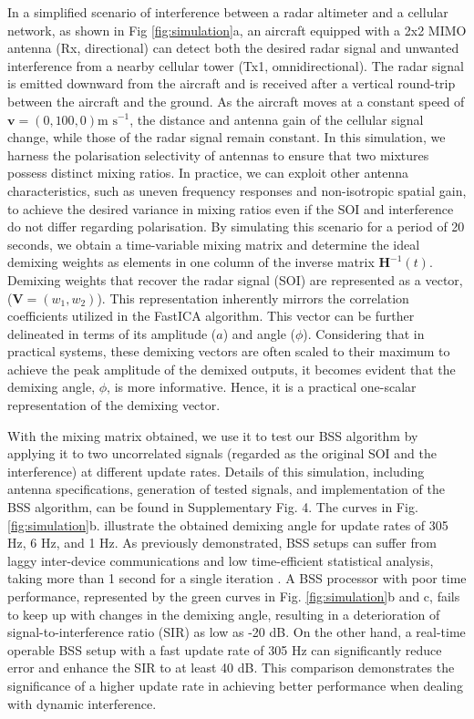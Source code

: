 \documentclass[pdflatex,mathphys]{sty}%
\begin{document}
In a simplified scenario of interference between a radar altimeter and a cellular network, as shown in Fig \ref{fig:simulation}a, an aircraft equipped with a 2x2 MIMO antenna (Rx, directional) can detect both the desired radar signal and unwanted interference from a nearby cellular tower (Tx1, omnidirectional). The radar signal is emitted downward from the aircraft and is received after a vertical round-trip between the aircraft and the ground. As the aircraft moves at a constant speed of $\textbf{v}=(0,100,0) \textrm{m s}^{-1}$, the distance and antenna gain of the cellular signal change, while those of the radar signal remain constant. In this simulation, we harness the polarisation selectivity of antennas to ensure that two mixtures possess distinct mixing ratios. In practice, we can exploit other antenna characteristics, such as uneven frequency responses and non-isotropic spatial gain, to achieve the desired variance in mixing ratios even if the SOI and interference do not differ regarding polarisation. By simulating this scenario for a period of 20 seconds, we obtain a time-variable mixing matrix and determine the ideal demixing weights as elements in one column of the inverse matrix $\textbf{H}^{-1}(t)$. Demixing weights that recover the radar signal (SOI) are represented as a vector, ($\textbf{V}=(w_1,w_2)$). This representation inherently mirrors the correlation coefficients utilized in the FastICA algorithm. This vector can be further delineated in terms of its amplitude ($a$) and angle ($\phi$). Considering that in practical systems, these demixing vectors are often scaled to their maximum to achieve the peak amplitude of the demixed outputs, it becomes evident that the demixing angle, $\phi$, is more informative. Hence, it is a practical one-scalar representation of the demixing vector.

With the mixing matrix obtained, we use it to test our BSS algorithm by applying it to two uncorrelated signals (regarded as the original SOI and the interference) at different update rates. Details of this simulation, including antenna specifications, generation of tested signals, and implementation of the BSS algorithm, can be found in Supplementary Fig. 4. The curves in Fig. \ref{fig:simulation}b. illustrate the obtained demixing angle for update rates of 305 Hz, 6 Hz, and 1 Hz. As previously demonstrated, BSS setups can suffer from laggy inter-device communications and low time-efficient statistical analysis, taking more than 1 second for a single iteration \cite{zhang2022broadband}. A BSS processor with poor time performance, represented by the green curves in Fig. \ref{fig:simulation}b and c, fails to keep up with changes in the demixing angle, resulting in a deterioration of signal-to-interference ratio (SIR) as low as -20 dB. On the other hand, a real-time operable BSS setup with a fast update rate of 305 Hz can significantly reduce error and enhance the SIR to at least 40 dB. This comparison demonstrates the significance of a higher update rate in achieving better performance when dealing with dynamic interference.
\end{document}
